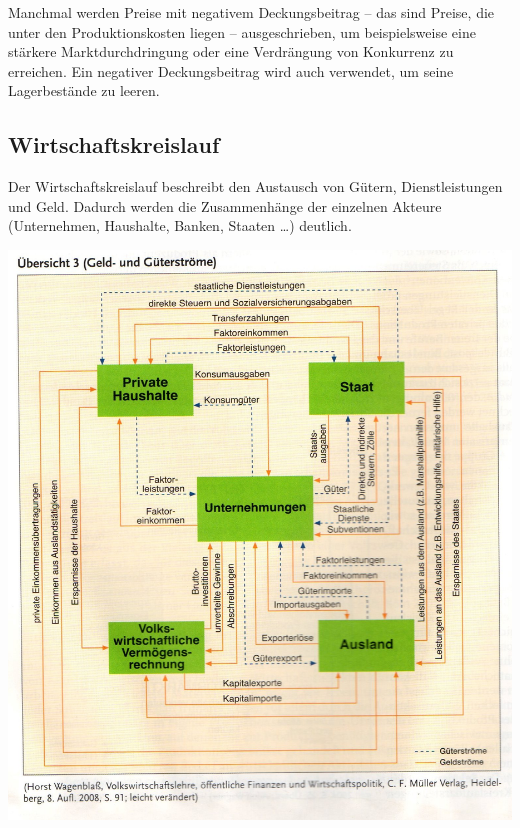Manchmal werden Preise mit negativem Deckungsbeitrag -- das sind Preise, die unter den Produktionskosten liegen -- ausgeschrieben, um beispielsweise eine stärkere Marktdurchdringung oder eine Verdrängung von Konkurrenz zu erreichen. Ein negativer Deckungsbeitrag wird auch verwendet, um seine Lagerbestände zu leeren.


\subsection{Wirtschaftskreislauf}

Der Wirtschaftskreislauf beschreibt den Austausch von Gütern, Dienstleistungen und Geld. Dadurch werden die Zusammenhänge der einzelnen Akteure (Unternehmen, Haushalte, Banken, Staaten \dots) deutlich. 

\includegraphics[scale=1.0]{1jahr_pictures/lf01-pic/lf01-wirtschaftskreislauf.jpg}


